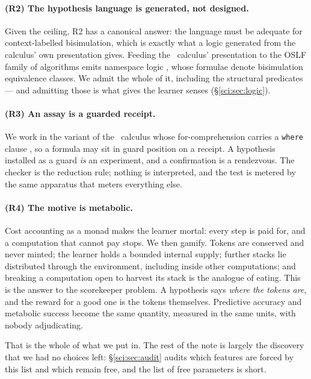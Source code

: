 \paragraph{(R2) The hypothesis language is generated, not designed.} Given the ceiling, R2 has a
canonical answer: the language must be adequate for context-labelled bisimulation, which is exactly
what a logic generated from the calculus' own presentation gives. Feeding the \rhoc\ calculus'
presentation to the OSLF family of algorithms \cite{OSLF} emits namespace logic
\cite{NamespaceLogic}, whose formulae denote bisimulation equivalence classes. We admit the whole of
it, including the structural predicates --- and admitting those is what gives the learner senses
(\S\ref{sci:sec:logic}).

\paragraph{(R3) An assay is a guarded receipt.} We work in the variant of the \rhoc\ calculus whose
for-comprehension carries a \texttt{where} clause \cite[\S9]{Omnibus}, so a formula may sit in guard
position on a receipt. A hypothesis installed as a guard \emph{is} an experiment, and a confirmation
is a rendezvous. The checker is the reduction rule; nothing is interpreted, and the test is metered by
the same apparatus that meters everything else.

\paragraph{(R4) The motive is metabolic.} Cost accounting as a monad \cite{CostMonad} makes the
learner mortal: every step is paid for, and a computation that cannot pay stops. We then gamify.
Tokens are conserved and never minted; the learner holds a bounded internal supply; further stacks lie
distributed through the environment, including inside other computations; and breaking a computation
open to harvest its stack is the analogue of eating. This is the answer to the scorekeeper problem. A
hypothesis says \emph{where the tokens are}, and the reward for a good one is the tokens themselves.
Predictive accuracy and metabolic success become the same quantity, measured in the same units, with
nobody adjudicating.

\medskip
\noindent That is the whole of what we put in. The rest of the note is largely the discovery that we
had no choices left: \S\ref{sci:sec:audit} audits which features are forced by this list and which remain
free, and the list of free parameters is short.

